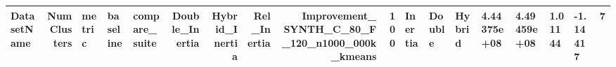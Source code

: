 \begin{tabular}{lrlllrrrrr}
\toprule
DatasetName & NumClusters & metric & baseline & compare_suite & Double_Inertia & Hybrid_Inertia & Rel_Inertia & Improvement_%
\midrule
SYNTH_C_80_F_120_n1000_000k_kmeans & 100 & Inertia & Double & Hybrid & 4.44375e+08 & 4.49459e+08 & 1.01144 & -1.14417 & 7 \\
\bottomrule
\end{tabular}
